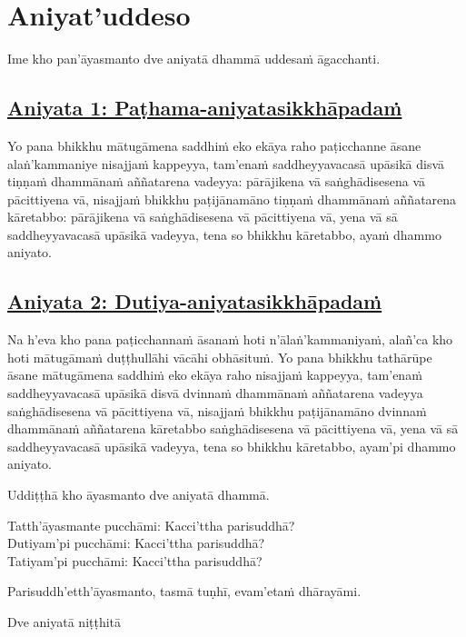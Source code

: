 \section{Aniyat'uddeso}
\label{aniy}

\begin{intro}
  Ime kho pan'āyasmanto dve aniyatā dhammā uddesaṁ āgacchanti.
\end{intro}

\subsection*{\hyperref[unc1]{Aniyata 1: Paṭhama-aniyatasikkhāpadaṁ}}
\label{aniy1}
Yo pana bhikkhu mātugāmena saddhiṁ eko ekāya raho paṭicchanne āsane alaṅ'kammaniye nisajjaṁ kappeyya, tam'enaṁ saddheyyavacasā upāsikā disvā tiṇṇaṁ dhammānaṁ aññatarena vadeyya: pārājikena vā saṅghādisesena vā pācittiyena vā, nisajjaṁ bhikkhu paṭijānamāno tiṇṇaṁ dhammānaṁ aññatarena kāretabbo: pārājikena vā saṅghādisesena vā pācittiyena vā, yena vā sā saddheyyavacasā upāsikā vadeyya, tena so bhikkhu kāretabbo, ayaṁ dhammo aniyato.

\subsection*{\hyperref[unc2]{Aniyata 2: Dutiya-aniyatasikkhāpadaṁ}}
\label{aniy2}
Na h'eva kho pana paṭicchannaṁ āsanaṁ hoti n'ālaṅ'kammaniyaṁ, alañ'ca kho hoti mātugāmaṁ duṭṭhullāhi vācāhi obhāsituṁ. Yo pana bhikkhu tathārūpe āsane mātugāmena saddhiṁ eko ekāya raho nisajjaṁ kappeyya, tam'enaṁ saddheyyavacasā upāsikā disvā dvinnaṁ dhammānaṁ aññatarena vadeyya saṅghādisesena vā pācittiyena vā, nisajjaṁ bhikkhu paṭijānamāno dvinnaṁ dhammānaṁ aññatarena kāretabbo saṅghādisesena vā pācittiyena vā, yena vā sā saddheyyavacasā upāsikā vadeyya, tena so bhikkhu kāretabbo, ayam'pi dhammo aniyato.

\medskip

\begin{center}
Uddiṭṭhā kho āyasmanto dve aniyatā dhammā.

\smallskip

Tatth'āyasmante pucchāmi: Kacci'ttha parisuddhā?\\
Dutiyam'pi pucchāmi: Kacci'ttha parisuddhā?\\
Tatiyam'pi pucchāmi: Kacci'ttha parisuddhā?

\smallskip

Parisuddh'etth'āyasmanto, tasmā tuṇhī, evam'etaṁ dhārayāmi.
\end{center}

\begin{outro}
  Dve aniyatā niṭṭhitā\makeatletter\hyperlink{endnote12-appendix}\makeatother
\end{outro}

\clearpage
